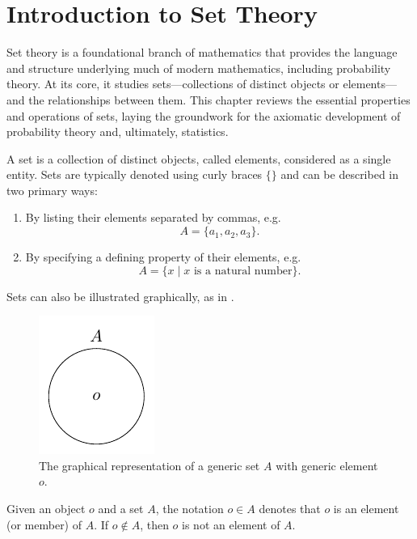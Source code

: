 \chapter{Introduction to Set Theory}
\label{chp:set_theory}
Set theory is a foundational branch of mathematics that provides the language and structure underlying much of modern mathematics, including probability theory. At its core, it studies sets---collections of distinct objects or elements---and the relationships between them. This chapter reviews the essential properties and operations of sets, laying the groundwork for the axiomatic development of probability theory and, ultimately, statistics.

\begin{definition}[Set]
	\label{def:set}
	A set is a collection of distinct objects, called elements, considered as a single entity. Sets are typically denoted using curly braces $\{\}$ and can be described in two primary ways:
	\begin{enumerate}
		\item By listing their elements separated by commas, e.g.
		\begin{equation}
			A = \{a_1, a_2, a_3\}.
		\end{equation}
		\item By specifying a defining property of their elements, e.g.
		\begin{equation}
			A = \{x \mid x \text{ is a natural number}\}.
		\end{equation}
	\end{enumerate}
	Sets can also be illustrated graphically, as in .
	\begin{figure}[H]
		\centering
		\includegraphics[]{figures/generic_set.pdf}
		\caption{The graphical representation of a generic set $A$ with generic element $o$.}
		\label{fig:generic_set}
	\end{figure}
\end{definition}

\begin{definition}[Membership]
	\label{def:membership}
	Given an object $o$ and a set $A$, the notation $o \in A$ denotes that $o$ is an element (or member) of $A$. If $o \notin A$, then $o$ is not an element of $A$.
\end{definition}

